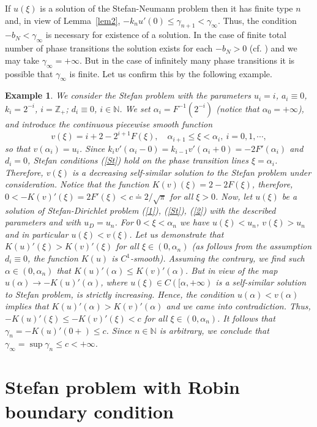 \documentclass[10pt,a4paper]{amsart}
\newtheorem{example}{Example}[section]
\numberwithin{equation}{section}
\newcommand{\N}{{\mathbb N}}
\newcommand{\Z}{{\mathbb Z}}
\begin{document}
If $u(\xi)$ is a solution of the Stefan-Neumann problem then it has finite type $n$ and, in view of Lemma~\ref{lem2}, $-k_nu'(0)\le\gamma_{n+1}<\gamma_\infty$. Thus, the condition $-b_N<\gamma_\infty$ is necessary for existence of a solution. In the case of finite total number of phase transitions the solution exists for each $-b_N>0$ (cf. \cite{Pan4}) and we may take $\gamma_\infty=+\infty$. But in the case of infinitely many phase transitions it is possible that
$\gamma_\infty$ is finite. Let us confirm this by the following example.

\begin{example}
We consider the Stefan problem with the parameters
$u_i=i$, $a_i\equiv 0$, $k_i=2^{-i}$, $i=\Z_+$; $d_i\equiv 0$, $i\in\N$. We set $\alpha_i=F^{-1}(2^{-i})$ (notice that $\alpha_0=+\infty$), and introduce the continuous piecewise smooth function
\[
v(\xi)=i+2-2^{i+1} F(\xi), \quad \alpha_{i+1}\le \xi<\alpha_i, \ i=0,1,\cdots,
\]
so that $v(\alpha_i)=u_i$.
Since $k_iv'(\alpha_i-0)=k_{i-1}v'(\alpha_i+0)=-2F'(\alpha_i)$ and $d_i=0$, Stefan conditions (\ref{St}) hold on the phase transition lines $\xi=\alpha_i$. Therefore, $v(\xi)$ is a decreasing self-similar solution to the Stefan problem under consideration. Notice that the function $K(v)(\xi)=2-2F(\xi)$, therefore, $0<-K(v)'(\xi)=2F'(\xi)<c\doteq 2/\sqrt{\pi}$ for all $\xi>0$. Now, let $u(\xi)$ be a solution of
Stefan-Dirichlet problem (\ref{1}), (\ref{St}), (\ref{2}) with the described parameters and with $u_D=u_n$. For $0<\xi<\alpha_n$ we have $u(\xi)<u_n$, $v(\xi)>u_n$ and in particular $u(\xi)<v(\xi)$. Let us demonstrate that $K(u)'(\xi)>K(v)'(\xi)$ for all $\xi\in (0,\alpha_n)$ (as follows from the assumption $d_i\equiv 0$, the function $K(u)$ is $C^1$-smooth). Assuming the contrary, we find such $\alpha\in (0,\alpha_n)$ that $K(u)'(\alpha)\le K(v)'(\alpha)$. But in view of \cite[Lemma 2]{Pan4}
the map $u(\alpha)\to -K(u)'(\alpha)$, where $u(\xi)\in C([\alpha,+\infty)$ is a self-similar solution to Stefan problem, is strictly increasing. Hence, the condition $u(\alpha)<v(\alpha)$ implies that $K(u)'(\alpha)>K(v)'(\alpha)$ and we came into contradiction. Thus, $-K(u)'(\xi)\le -K(v)'(\xi)<c$ for all $\xi\in (0,\alpha_n)$. It follows that $\gamma_n=-K(u)'(0+)\le c$.
Since $n\in\N$ is arbitrary, we conclude that $\gamma_\infty=\sup\gamma_n \le c<+\infty$.

\end{example}


\section{Stefan problem with Robin boundary condition}\label{sec3}
\end{document}
